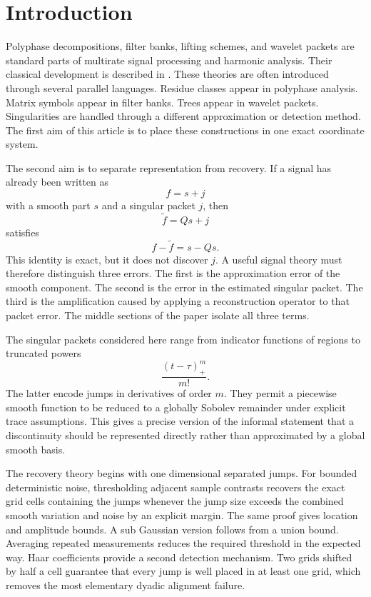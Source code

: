 \documentclass[11pt,a4paper]{article}
\theoremstyle{definition}
\theoremstyle{remark}
\begin{document}
\section{Introduction}\label{extension:section:01}\label{sec:introduction}

Polyphase decompositions, filter banks, lifting schemes, and wavelet packets are standard parts of multirate signal processing and harmonic analysis. Their classical development is described in \cite{CrochiereRabiner1983,Vaidyanathan1993,VetterliKovacevic1995,StrangNguyen1996,Daubechies1992,Mallat2009}. These theories are often introduced through several parallel languages. Residue classes appear in polyphase analysis. Matrix symbols appear in filter banks. Trees appear in wavelet packets. Singularities are handled through a different approximation or detection method. The first aim of this article is to place these constructions in one exact coordinate system.

The second aim is to separate representation from recovery. If a signal has already been written as
\[
f=s+j
\]
with a smooth part \(s\) and a singular packet \(j\), then
\[
\widetilde f=Qs+j
\]
satisfies
\[
f-\widetilde f=s-Qs.
\]
This identity is exact, but it does not discover \(j\). A useful signal theory must therefore distinguish three errors. The first is the approximation error of the smooth component. The second is the error in the estimated singular packet. The third is the amplification caused by applying a reconstruction operator to that packet error. The middle sections of the paper isolate all three terms.

The singular packets considered here range from indicator functions of regions to truncated powers
\[
\frac{(t-\tau)_+^m}{m!}.
\]
The latter encode jumps in derivatives of order \(m\). They permit a piecewise smooth function to be reduced to a globally Sobolev remainder under explicit trace assumptions. This gives a precise version of the informal statement that a discontinuity should be represented directly rather than approximated by a global smooth basis.

The recovery theory begins with one dimensional separated jumps. For bounded deterministic noise, thresholding adjacent sample contrasts recovers the exact grid cells containing the jumps whenever the jump size exceeds the combined smooth variation and noise by an explicit margin. The same proof gives location and amplitude bounds. A sub Gaussian version follows from a union bound. Averaging repeated measurements reduces the required threshold in the expected way. Haar coefficients provide a second detection mechanism. Two grids shifted by half a cell guarantee that every jump is well placed in at least one grid, which removes the most elementary dyadic alignment failure.
\end{document}
